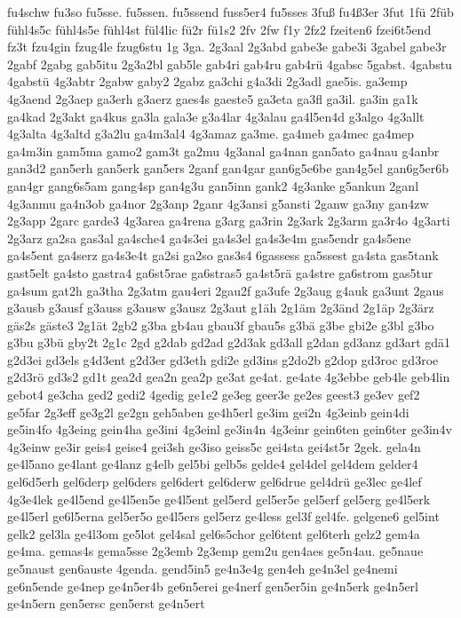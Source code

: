 {fu4schw
fu3so
fu5sse.
fu5ssen.
fu5ssend
fuss5er4
fu5sses
3fuß
fu4ß3er
3fut
1fü
2füb
fühl4s5c
fühl4s5e
fühl4st
fül4lic
fü2r
fü1s2
2fv
2fw
f1y
2fz2
fzeiten6
fzei6t5end
fz3t
fzu4gin
fzug4le
fzug6stu
1g
3ga.
2g3aal
2g3abd
gabe3e
gabe3i
3gabel
gabe3r
2gabf
2gabg
gab5itu
2g3a2bl
gab5le
gab4ri
gab4ru
gab4rü
4gabsc
5gabst.
4gabstu
4gabstü
4g3abtr
2gabw
gaby2
2gabz
ga3chi
g4a3di
2g3adl
gae5is.
ga3emp
4g3aend
2g3aep
ga3erh
g3aerz
gaes4s
gaeste5
ga3eta
ga3fl
ga3il.
ga3in
ga1k
ga4kad
2g3akt
ga4kus
ga3la
gala3e
g3a4lar
4g3alau
ga4l5en4d
g3algo
4g3allt
4g3alta
4g3altd
g3a2lu
ga4m3al4
4g3amaz
ga3me.
ga4meb
ga4mec
ga4mep
ga4m3in
gam5ma
gamo2
gam3t
ga2mu
4g3anal
ga4nan
gan5ato
ga4nau
g4anbr
gan3d2
gan5erh
gan5erk
gan5ers
2ganf
gan4gar
gan6g5e6be
gan4g5el
gan6g5er6b
gan4gr
gang6s5am
gang4sp
gan4g3u
gan5inn
gank2
4g3anke
g5ankun
2ganl
4g3anmu
ga4n3ob
ga4nor
2g3anp
2ganr
4g3ansi
g5ansti
2ganw
ga3ny
gan4zw
2g3app
2garc
garde3
4g3area
ga4rena
g3arg
ga3rin
2g3ark
2g3arm
ga3r4o
4g3arti
2g3arz
ga2sa
gas3al
ga4sche4
ga4s3ei
ga4s3el
ga4s3e4m
gas5endr
ga4s5ene
ga4s5ent
ga4serz
ga4s3e4t
ga2si
ga2so
gas3s4
6gassess
ga5ssest
ga4sta
gas5tank
gast5elt
ga4sto
gastra4
ga6st5rae
ga6stras5
ga4st5rä
ga4stre
ga6strom
gas5tur
ga4sum
gat2h
ga3tha
2g3atm
gau4eri
2gau2f
ga3ufe
2g3aug
g4auk
ga3unt
2gaus
g3ausb
g3ausf
g3auss
g3ausw
g3ausz
2g3aut
g1äh
2g1äm
2g3änd
2g1äp
2g3ärz
gäs2s
gäste3
2g1ät
2gb2
g3ba
gb4au
gbau3f
gbau5s
g3bä
g3be
gbi2e
g3bl
g3bo
g3bu
g3bü
gby2t
2g1c
2gd
g2dab
gd2ad
g2d3ak
gd3all
g2dan
gd3anz
gd3art
gdä1
g2d3ei
gd3els
g4d3ent
g2d3er
gd3eth
gdi2e
gd3ins
g2do2b
g2dop
gd3roc
gd3roe
g2d3rö
gd3s2
gd1t
gea2d
gea2n
gea2p
ge3at
ge4at.
ge4ate
4g3ebbe
geb4le
geb4lin
gebot4
ge3cha
ged2
gedi2
4gedig
ge1e2
ge3eg
geer3e
ge2es
geest3
ge3ev
gef2
ge5far
2g3eff
ge3g2l
ge2gn
geh5aben
ge4h5erl
ge3im
gei2n
4g3einb
gein4di
ge5in4fo
4g3eing
gein4ha
ge3ini
4g3einl
ge3in4n
4g3einr
gein6ten
gein6ter
ge3in4v
4g3einw
ge3ir
geis4
geise4
gei3sh
ge3iso
geiss5c
gei4sta
gei4st5r
2gek.
gela4n
ge4l5ano
ge4lant
ge4lanz
g4elb
gel5bi
gelb5s
gelde4
gel4del
gel4dem
gelder4
gel6d5erh
gel6derp
gel6ders
gel6dert
gel6derw
gel6drue
gel4drü
ge3lec
ge4lef
4g3e4lek
ge4l5end
ge4l5en5e
ge4l5ent
gel5erd
gel5er5e
gel5erf
gel5erg
ge4l5erk
ge4l5erl
ge6l5erna
gel5er5o
ge4l5ers
gel5erz
ge4less
gel3f
gel4fe.
gelgene6
gel5int
gelk2
gel3la
ge4l3om
ge5lot
gel4sal
gel6s5chor
gel6tent
gel6terh
gelz2
gem4a
ge4ma.
gemas4s
gema5sse
2g3emb
2g3emp
gem2u
gen4aes
ge5n4au.
ge5naue
ge5naust
gen6auste
4genda.
gend5in5
ge4n3e4g
gen4eh
ge4n3el
ge4nemi
ge6n5ende
ge4nep
ge4n5er4b
ge6n5erei
ge4nerf
gen5er5in
ge4n5erk
ge4n5erl
ge4n5ern
gen5ersc
gen5erst
ge4n5ert
}
